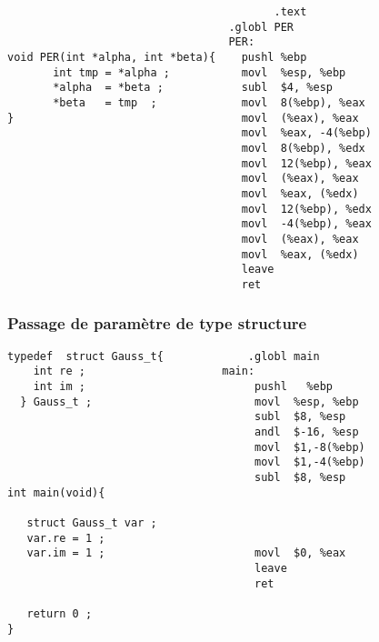 \begin{frame}[fragile]
\begin{verbatim}
                                         .text          
                                  .globl PER                   
                                  PER:                     
void PER(int *alpha, int *beta){    pushl %ebp             
       int tmp = *alpha ;           movl  %esp, %ebp     
       *alpha  = *beta ;            subl  $4, %esp      
       *beta   = tmp  ;             movl  8(%ebp), %eax  
}                                   movl  (%eax), %eax     
                                    movl  %eax, -4(%ebp)   
                                    movl  8(%ebp), %edx 
                                    movl  12(%ebp), %eax
                                    movl  (%eax), %eax     
                                    movl  %eax, (%edx)  
                                    movl  12(%ebp), %edx   
                                    movl  -4(%ebp), %eax  
                                    movl  (%eax), %eax  
                                    movl  %eax, (%edx)  
                                    leave                           
                                    ret                 
\end{verbatim}
\end{frame}
\begin{frame}[fragile]
  \frametitle{Passage de param\`etre de type structure}%
\begin{verbatim}
typedef  struct Gauss_t{             .globl main   
    int re ;                     main:             
    int im ;                          pushl   %ebp    
  } Gauss_t ;                         movl  %esp, %ebp  
                                      subl  $8, %esp    
                                      andl  $-16, %esp  
                                      movl  $1,-8(%ebp) 
                                      movl  $1,-4(%ebp) 
                                      subl  $8, %esp   
int main(void){                     
                                   
   struct Gauss_t var ;            
   var.re = 1 ;                    
   var.im = 1 ;                       movl  $0, %eax   
                                      leave         
                                      ret             

   return 0 ;
}                                      
\end{verbatim}
\end{frame}
